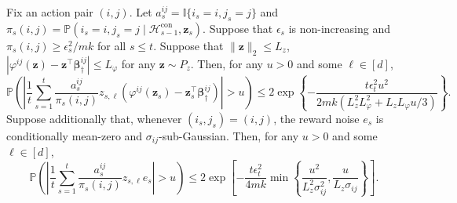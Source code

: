 \documentclass[12pt]{article}
\begin{document}
\begin{lemma}
\label{lem:context_ipw_score_concentration}
Fix an action pair $(i,j)$. Let $a_s^{ij}=\mathbb I\{i_s=i,j_s=j\}$ and $\pi_s(i,j)=\mathbb P\left(i_s=i,j_s=j\mid\mathcal H_{s-1}^{\mathrm{con}},\bm z_s\right)$.
Suppose that $\epsilon_s$ is non-increasing and $\pi_s(i,j)\ge {\epsilon_s^2}/{mk}$ for all $s\le t$.
Suppose that $\|\bm z\|_2 \le L_z$, $|\varphi^{ij}(\bm z) - \bm z^\top\bm\beta_\dagger^{ij}| \le L_\varphi$ for any $\bm{z} \sim P_z$. 
Then, for any $u>0$ and some $\ell \in [d]$,
\begin{equation}
\label{equ:ipw_approximation_score_tail}
\mathbb P
\left(\left|
\frac{1}{t}\sum_{s=1}^t\frac{a_s^{ij}}{\pi_s(i,j)}z_{s,\ell} \left(\varphi^{ij}(\bm z_s) - \bm z_s^\top\bm\beta_\dagger^{ij}\right)\right|> u \right)
\le
2\exp\left\{-\frac{t\epsilon_t^2u^2}{2mk\left(L_z^2L_\varphi^2+L_zL_\varphi u/3\right)}\right\}.    
\end{equation}
Suppose additionally that, whenever $(i_s,j_s)=(i,j)$, the reward noise $e_s$ is conditionally mean-zero and $\sigma_{ij}$-sub-Gaussian. Then, for any $u>0$ and some $\ell \in [d]$,
\begin{equation}
\label{equ:ipw_noise_score_tail}
\mathbb P
\left(\left|
\frac{1}{t}\sum_{s=1}^t\frac{a_s^{ij}}{\pi_s(i,j)}z_{s,\ell}e_s
\right|>u\right)
\le
2\exp\left[-\frac{t\epsilon_t^2}{4mk}\min\left\{\frac{u^2}{L_z^2\sigma_{ij}^2},\frac{u}{L_z\sigma_{ij}}
\right\}
\right].
\end{equation}
\end{lemma}
\end{document}
